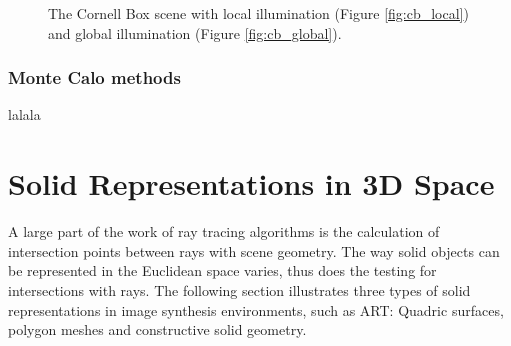 \begin{figure}
	\centering
	\hfill
	\caption{The Cornell Box scene with local illumination (Figure \ref{fig:cb_local}) and global illumination (Figure \ref{fig:cb_global}).}
\end{figure}

\subsubsection{Monte Calo methods}
lalala


\section{Solid Representations in 3D Space}

A large part of the work of ray tracing algorithms is the calculation of intersection points between rays with scene geometry.
The way solid objects can be represented in the Euclidean space varies, thus does the testing for intersections with rays. The following section illustrates three types of solid representations in image synthesis environments, such as ART: Quadric surfaces, polygon meshes and constructive solid geometry.

